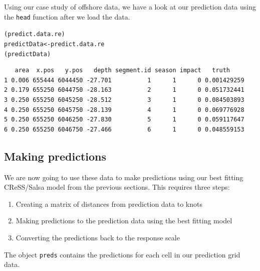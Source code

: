 \noindent Using our case study of offshore data, we have a look at our prediction data using the {\tt head} function after we load the data. 
\begin{knitrout}\footnotesize
{}\color{fgcolor}\begin{kframe}
\begin{alltt}
(predict.data.re)
predictData <- predict.data.re
(predictData)
\end{alltt}
\begin{verbatim}
   area  x.pos   y.pos   depth segment.id season impact   truth
1 0.006 655444 6044450 -27.701          1      1      0 0.001429259
2 0.179 655250 6044750 -28.163          2      1      0 0.051732441
3 0.250 655250 6045250 -28.512          3      1      0 0.084503893
4 0.250 655250 6045750 -28.139          4      1      0 0.069776928
5 0.250 655250 6046250 -27.830          5      1      0 0.059117647
6 0.250 655250 6046750 -27.466          6      1      0 0.048559153
\end{verbatim}
\end{kframe}
\end{knitrout}

\subsection{Making predictions}
\label{ss:predictions}
\noindent We are now going to use these data to make predictions using our best fitting CReSS/Salsa model from the previous sections. This requires three steps: 
\begin{enumerate}
\item{Creating a matrix of distances from prediction data to knots}
\item{Making predictions to the prediction data using the best fitting model}
\item{Converting the predictions back to the response scale}
\end{enumerate}
\begin{knitrout}\footnotesize
{}\color{fgcolor}
\end{knitrout}
\noindent The object {\tt preds} contains the predictions for each cell in our prediction grid data. 


